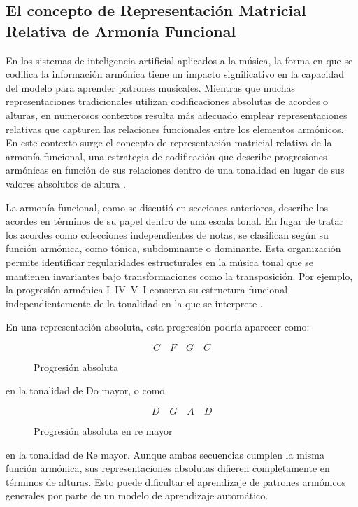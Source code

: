 \documentclass[12pt]{report}
\begin{document}
\subsection{El concepto de Representación Matricial Relativa de Armonía Funcional}
En los sistemas de inteligencia artificial aplicados a la música, la forma en que se codifica la información armónica tiene un impacto significativo en la capacidad del modelo para aprender patrones musicales. Mientras que muchas representaciones tradicionales utilizan codificaciones absolutas de acordes o alturas, en numerosos contextos resulta más adecuado emplear representaciones relativas que capturen las relaciones funcionales entre los elementos armónicos. En este contexto surge el concepto de representación matricial relativa de la armonía funcional, una estrategia de codificación que describe progresiones armónicas en función de sus relaciones dentro de una tonalidad en lugar de sus valores absolutos de altura \cite{hadjeres2017deepbach}.

La armonía funcional, como se discutió en secciones anteriores, describe los acordes en términos de su papel dentro de una escala tonal. En lugar de tratar los acordes como colecciones independientes de notas, se clasifican según su función armónica, como tónica, subdominante o dominante. Esta organización permite identificar regularidades estructurales en la música tonal que se mantienen invariantes bajo transformaciones como la transposición. Por ejemplo, la progresión armónica I–IV–V–I conserva su estructura funcional independientemente de la tonalidad en la que se interprete \cite{dehaas2013modeling}.

En una representación absoluta, esta progresión podría aparecer como:

\begin{figure}[h]
\centering
\[
C \quad F \quad G \quad C
\]
\caption{Progresión absoluta}
\end{figure}


en la tonalidad de Do mayor, o como

\begin{figure}[h]
\centering
\[
D \quad G \quad A \quad D
\]
\caption{Progresión absoluta en re mayor}
\end{figure}



en la tonalidad de Re mayor. Aunque ambas secuencias cumplen la misma función armónica, sus representaciones absolutas difieren completamente en términos de alturas. Esto puede dificultar el aprendizaje de patrones armónicos generales por parte de un modelo de aprendizaje automático.
\end{document}
